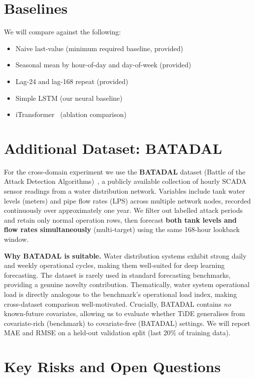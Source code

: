 \documentclass[11pt,a4paper]{article}
\begin{document}
\section*{Baselines}

We will compare against the following:
\begin{itemize}
  \setlength\itemsep{0pt}
  \item Naive last-value (minimum required baseline, provided)
  \item Seasonal mean by hour-of-day and day-of-week (provided)
  \item Lag-24 and lag-168 repeat (provided)
  \item Simple LSTM (our neural baseline)
  \item iTransformer~\cite{liu2024itransformer} (ablation comparison)
\end{itemize}

\section*{Additional Dataset: BATADAL}

For the cross-domain experiment we use the \textbf{BATADAL} dataset
(Battle of the Attack Detection Algorithms)~\cite{taormina2018batadal},
a publicly available collection of hourly SCADA sensor readings from a
water distribution network.
Variables include tank water levels (meters) and pipe flow rates (LPS) across
multiple network nodes, recorded continuously over approximately one year.
We filter out labelled attack periods and retain only normal operation rows,
then forecast \textbf{both tank levels and flow rates simultaneously}
(multi-target) using the same 168-hour lookback window.

\textbf{Why BATADAL is suitable.}
Water distribution systems exhibit strong daily and weekly operational cycles,
making them well-suited for deep learning forecasting.
The dataset is rarely used in standard forecasting benchmarks, providing a
genuine novelty contribution.
Thematically, water system operational load is directly analogous to the
benchmark's operational load index, making cross-dataset comparison
well-motivated.
Crucially, BATADAL contains \emph{no} known-future covariates, allowing us to
evaluate whether TiDE generalises from covariate-rich (benchmark) to
covariate-free (BATADAL) settings.
We will report MAE and RMSE on a held-out validation split (last 20\% of
training data).

\section*{Key Risks and Open Questions}
\end{document}
